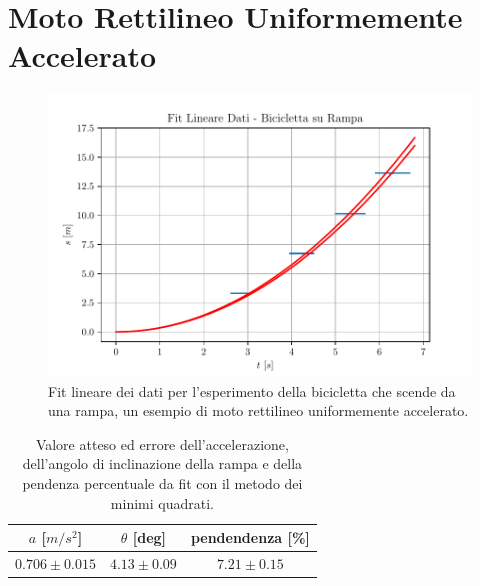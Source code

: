 \documentclass{report} \usepackage[T1]{fontenc} \usepackage[italian]{babel}
\begin{document}
\section{Moto Rettilineo Uniformemente Accelerato}

\begin{figure}[H]
  \centering
  \includegraphics[width=\textwidth]{fit_bike}
  \caption{Fit lineare dei dati per l'esperimento della bicicletta che scende da una rampa,
           un esempio di moto rettilineo uniformemente accelerato.}
  \label{fig:fit_bike}
\end{figure}

\begin{table}[H]
  \renewcommand{\arraystretch}{1.5}
  \centering
  \begin{tabular}{ | c | c | c | }
    \hline
    $a$ [$m/s^2$] &  $\theta$ [deg] & pendendenza [\%] \\
    \hline
    $0.706\pm0.015$ & $4.13\pm0.09$ & $7.21\pm0.15$ \\
    \hline
  \end{tabular}
  \caption{Valore atteso ed errore dell'accelerazione, dell'angolo di inclinazione della rampa
           e della pendenza percentuale da fit con il metodo dei minimi quadrati.}
  \label{tab:fit_bike}
\end{table}

{}

\end{document}

